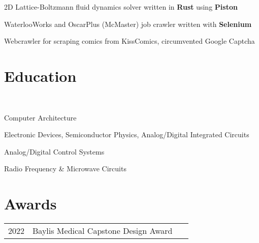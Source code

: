 \documentclass[]{chandan-cv}
\begin{document}
\begin{minipage}[t]{0.77\textwidth}
\descript{ }
\location{ }
\begin{tightemize}
	\item 2D Lattice-Boltzmann fluid dynamics solver written in \textbf{Rust} using \textbf{Piston}
	\item WaterlooWorks and OscarPlus (McMaster) job crawler written with \textbf{Selenium}
	\item Webcrawler for scraping comics from KissComics, circumvented Google Captcha
\end{tightemize}
\sectionsep

\section{Education}

 \\


\descript{ }
\location{ }
\begin{tightemize}
        \item Computer Architecture
		\item Electronic Devices, Semiconductor Physics, Analog/Digital Integrated Circuits
		\item Analog/Digital Control Systems
		\item Radio Frequency \& Microwave Circuits
\end{tightemize}
\sectionsep


\section{Awards}
\begin{tabular}{rll}
2022		&	Baylis Medical Capstone Design Award\
\end{tabular}
\sectionsep
\end{minipage}
\end{document}
